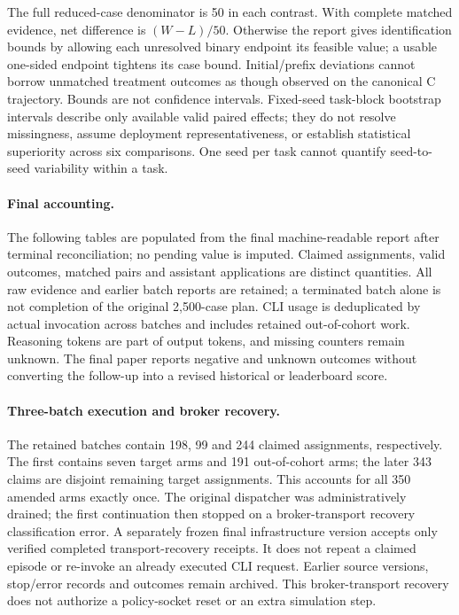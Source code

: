 The full reduced-case denominator is 50 in each contrast. With complete matched evidence, net difference is $(W-L)/50$. Otherwise the report gives identification bounds by allowing each unresolved binary endpoint its feasible value; a usable one-sided endpoint tightens its case bound. Initial/prefix deviations cannot borrow unmatched treatment outcomes as though observed on the canonical C trajectory. Bounds are not confidence intervals. Fixed-seed task-block bootstrap intervals describe only available valid paired effects; they do not resolve missingness, assume deployment representativeness, or establish statistical superiority across six comparisons. One seed per task cannot quantify seed-to-seed variability within a task.

\paragraph{Final accounting.}
\ReducedStatus{} \ReducedSummary{} The following tables are populated from the final machine-readable report after terminal reconciliation; no pending value is imputed. Claimed assignments, valid outcomes, matched pairs and assistant applications are distinct quantities. All raw evidence and earlier batch reports are retained; a terminated batch alone is not completion of the original 2,500-case plan. CLI usage is deduplicated by actual invocation across batches and includes retained out-of-cohort work. Reasoning tokens are part of output tokens, and missing counters remain unknown. The final paper reports negative and unknown outcomes without converting the follow-up into a revised historical or leaderboard score.

\paragraph{Three-batch execution and broker recovery.}
The retained batches contain 198, 99 and 244 claimed assignments, respectively. The first contains seven target arms and 191 out-of-cohort arms; the later 343 claims are disjoint remaining target assignments. This accounts for all 350 amended arms exactly once. The original dispatcher was administratively drained; the first continuation then stopped on a broker-transport recovery classification error. A separately frozen final infrastructure version accepts only verified completed transport-recovery receipts. It does not repeat a claimed episode or re-invoke an already executed CLI request. Earlier source versions, stop/error records and outcomes remain archived. This broker-transport recovery does not authorize a policy-socket reset or an extra simulation step.

